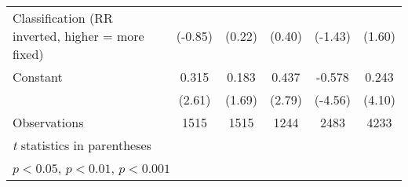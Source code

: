 {\begin{tabular}{l*{5}{c}}
Classification (RR inverted, higher = more fixed)&   (-0.85)         &    (0.22)         &    (0.40)         &   (-1.43)         &    (1.60)         \\
\addlinespace
Constant                                &     0.315\sym{*}  &     0.183         &     0.437\sym{**} &    -0.578\sym{***}&     0.243\sym{***}\\
                                        &    (2.61)         &    (1.69)         &    (2.79)         &   (-4.56)         &    (4.10)         \\
\midrule
Observations                            &      1515         &      1515         &      1244         &      2483         &      4233         \\
\bottomrule
\multicolumn{6}{l}{\footnotesize \textit{t} statistics in parentheses}\\
\multicolumn{6}{l}{\footnotesize \sym{*} \(p<0.05\), \sym{**} \(p<0.01\), \sym{***} \(p<0.001\)}\\
\end{tabular}
}
